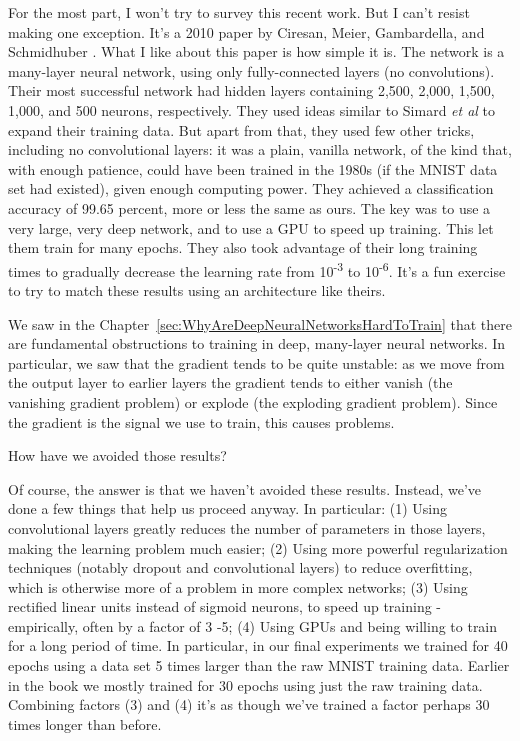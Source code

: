 For the most part, I won't try to survey this recent work. But I can't resist making one exception. It's a 2010 paper by Ciresan, Meier, Gambardella, and Schmidhuber \cite{Ciresan2010}. What I like about this paper is how simple it is. The network is a many-layer neural network, using only fully-connected layers (no convolutions). Their most successful network had hidden layers containing 2,500, 2,000, 1,500, 1,000, and 500 neurons, respectively. They used ideas similar to Simard \textit{et al} to expand their training data. But apart from that, they used few other tricks, including no convolutional layers: it was a plain, vanilla network, of the kind that, with enough patience, could have been trained in the 1980s (if the MNIST data set had existed), given enough computing power. They achieved a classification accuracy of 99.65 percent, more or less the same as ours. The key was to use a very large, very deep network, and to use a GPU to speed up training. This let them train for many epochs. They also took advantage of their long training times to gradually decrease the learning rate from 10\textsuperscript{-3} to 10\textsuperscript{-6}. It's a fun exercise to try to match these results using an architecture like theirs.

 We saw in the Chapter~\ref{sec:WhyAreDeepNeuralNetworksHardToTrain} that there are fundamental obstructions to training in deep, many-layer neural networks. In particular, we saw that the gradient tends to be quite unstable: as we move from the output layer to earlier layers the gradient tends to either vanish (the vanishing gradient problem) or explode (the exploding gradient problem). Since the gradient is the signal we use to train, this causes problems.

How have we avoided those results? 

Of course, the answer is that we haven't avoided these results. Instead, we've done a few things that help us proceed anyway. In particular: (1) Using convolutional layers greatly reduces the number of parameters in those layers, making the learning problem much easier; (2) Using more powerful regularization techniques (notably dropout and convolutional layers) to reduce overfitting, which is otherwise more of a problem in more complex networks; (3) Using rectified linear units instead of sigmoid neurons, to speed up training - empirically, often by a factor of 3 -5; (4) Using GPUs and being willing to train for a long period of time. In particular, in our final experiments we trained for 40 epochs using a data set 5 times larger than the raw MNIST training data. Earlier in the book we mostly trained for 30 epochs using just the raw training data. Combining factors (3) and (4) it's as though we've trained a factor perhaps 30 times longer than before.

